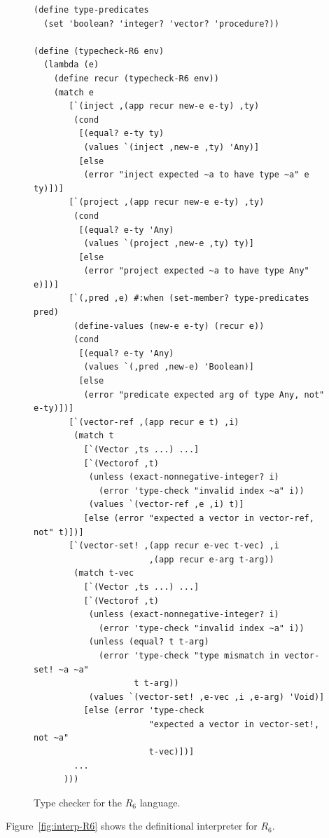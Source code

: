 \documentclass[11pt]{book}
\begin{document}
\begin{figure}[tbp]
\begin{lstlisting}[basicstyle=\ttfamily\footnotesize]
(define type-predicates
  (set 'boolean? 'integer? 'vector? 'procedure?))

(define (typecheck-R6 env)
  (lambda (e)
    (define recur (typecheck-R6 env))
    (match e
       [`(inject ,(app recur new-e e-ty) ,ty)
        (cond
         [(equal? e-ty ty)
          (values `(inject ,new-e ,ty) 'Any)]
         [else
          (error "inject expected ~a to have type ~a" e ty)])]
       [`(project ,(app recur new-e e-ty) ,ty)
        (cond
         [(equal? e-ty 'Any)
          (values `(project ,new-e ,ty) ty)]
         [else
          (error "project expected ~a to have type Any" e)])]
       [`(,pred ,e) #:when (set-member? type-predicates pred)
        (define-values (new-e e-ty) (recur e))
        (cond
         [(equal? e-ty 'Any)
          (values `(,pred ,new-e) 'Boolean)]
         [else
          (error "predicate expected arg of type Any, not" e-ty)])]
       [`(vector-ref ,(app recur e t) ,i)
        (match t
          [`(Vector ,ts ...) ...]
          [`(Vectorof ,t)
           (unless (exact-nonnegative-integer? i)
             (error 'type-check "invalid index ~a" i))
           (values `(vector-ref ,e ,i) t)]
          [else (error "expected a vector in vector-ref, not" t)])]
       [`(vector-set! ,(app recur e-vec t-vec) ,i
                       ,(app recur e-arg t-arg))
        (match t-vec
          [`(Vector ,ts ...) ...]
          [`(Vectorof ,t)
           (unless (exact-nonnegative-integer? i)
             (error 'type-check "invalid index ~a" i))
           (unless (equal? t t-arg)
             (error 'type-check "type mismatch in vector-set! ~a ~a"
                    t t-arg))
           (values `(vector-set! ,e-vec ,i ,e-arg) 'Void)]
          [else (error 'type-check
                       "expected a vector in vector-set!, not ~a"
                       t-vec)])]
        ...
      )))
\end{lstlisting}
\caption{Type checker for the $R_6$ language.}
\label{fig:typecheck-R6}
\end{figure}




Figure~\ref{fig:interp-R6} shows the definitional interpreter
for $R_6$.
\end{document}
